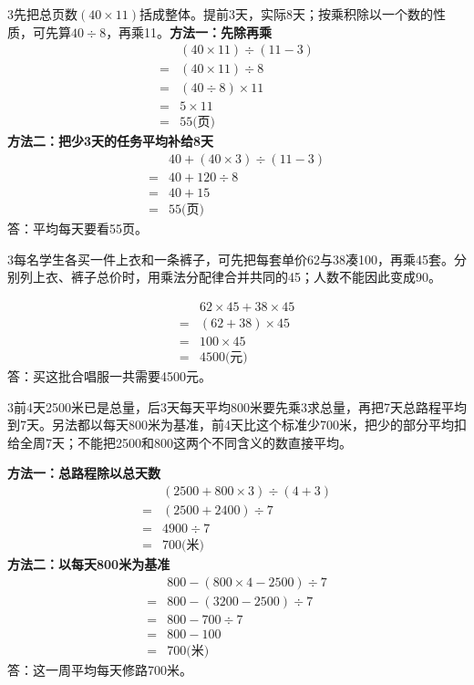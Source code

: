 \documentclass[multi=snippet,border={5bp 20bp 5bp 5bp}]{standalone}
\newenvironment{snippet}[3]{\begin{minipage}{#1bp}\color{answerred}\fontsize{#2}{#3}\selectfont\raggedright}{\end{minipage}}
\begin{document}
\begin{snippet}{505}{11.5}{14}\begin{multicols}{3}\raggedcolumns 先把总页数\((40\times11)\)\allowbreak 括成整体。提前3天，实际8天；按乘积除以一个数的性质，可先算\(40\div8\)\allowbreak ，再乘11。\textbf{方法一：先除再乘}\[\begin{aligned}&(40\times11)\div(11-3)\\={}&(40\times11)\div8\\={}&(40\div8)\times11\\={}&5\times11\\={}&55\text{(页)}\end{aligned}\]\textbf{方法二：把少3天的任务平均补给8天}\[\begin{aligned}&40+(40\times3)\div(11-3)\\={}&40+120\div8\\={}&40+15\\={}&55\text{(页)}\end{aligned}\]答：平均每天要看55页。\end{multicols}\end{snippet}
\begin{snippet}{505}{11.5}{14}\begin{multicols}{3}\raggedcolumns 每名学生各买一件上衣和一条裤子，可先把每套单价62与38凑100，再乘45套。分别列上衣、裤子总价时，用乘法分配律合并共同的45；人数不能因此变成90。\par \[\begin{aligned}&62\times45+38\times45\\={}&(62+38)\times45\\={}&100\times45\\={}&4500\text{(元)}\end{aligned}\]答：买这批合唱服一共需要4500元。\end{multicols}\end{snippet}
\begin{snippet}{505}{11.5}{14}\begin{multicols}{3}\raggedcolumns 前4天2500米已是总量，后3天每天平均800米要先乘3求总量，再把7天总路程平均到7天。另法都以每天800米为基准，前4天比这个标准少700米，把少的部分平均扣给全周7天；不能把2500和800这两个不同含义的数直接平均。\par \textbf{方法一：总路程除以总天数}\[\begin{aligned} &(2500+800\times3)\div(4+3)\\={}&(2500+2400)\div7\\={}&4900\div7\\={}&700\text{(米)}\end{aligned}\]\textbf{方法二：以每天800米为基准}\[\begin{aligned} &800-(800\times4-2500)\div7\\={}&800-(3200-2500)\div7\\={}&800-700\div7\\={}&800-100\\={}&700\text{(米)}\end{aligned}\]答：这一周平均每天修路700米。\end{multicols}\end{snippet}
\end{document}
